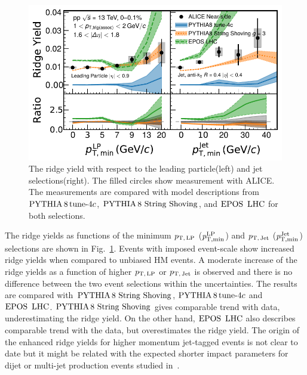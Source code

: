 \begin{figure}[h!]
	\centering
	\includegraphics[width=0.89\linewidth]{./figures/Fig6_RidgeYieldESE.pdf}
	\caption{The ridge yield with respect to the leading particle(left) and jet selections(right). The filled circles show measurement with ALICE. The measurements are compared with model descriptions from $\mathrm{PYTHIA}\,8\,\mathrm{tune}{\text -}4c$, ${\mathrm{PYTHIA}\,8~\mathrm{String}~}\mathrm{Shoving}$, and ${\mathrm{EPOS}\,~\mathrm{LHC}}$ for both selections.}
	\label{fig:RidgeYield_ESE}
\end{figure}

The ridge yields as functions of the minimum $p_\mathrm{T,\,LP}$ ($\it{p}^{\rm{LP}}_{\rm{T,min}}$) and $p_\mathrm{T,\,Jet}$ ($\it{p}^{\rm{Jet}}_{\rm{T,min}}$) selections are shown in Fig.~\ref{fig:RidgeYield_ESE}. Events with imposed event-scale show  increased ridge yields when compared to unbiased HM events. A moderate increase of the ridge yields as a function of higher $p_\mathrm{T,\,LP}$ or $p_\mathrm{T,\,Jet}$ is observed and there is no difference between the two event selections within the uncertainties.
The results are compared with ${\mathrm{PYTHIA}\,8~\mathrm{String}~}\mathrm{Shoving}$, $\mathrm{PYTHIA}\,8\,\mathrm{tune}{\text -}4c$ and ${\mathrm{EPOS}\,~\mathrm{LHC}}$. ${\mathrm{PYTHIA}\,8~\mathrm{String}~}\mathrm{Shoving}$ gives comparable trend with data, underestimating the ridge yield. On the other hand, ${\mathrm{EPOS}\,~\mathrm{LHC}}$ also describes comparable trend with the data, but overestimates the ridge yield. The origin of the enhanced ridge yields for higher momentum jet-tagged events is not clear to date but it might be related with the expected shorter impact parameters for dijet or multi-jet production events studied in~\cite{Frankfurt:2010ea}.

